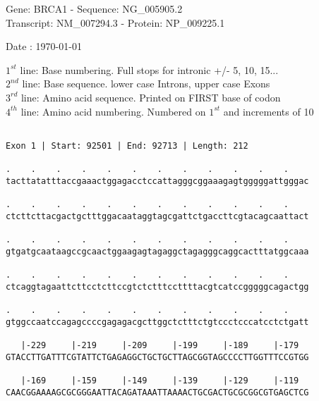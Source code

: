 \documentclass{article}
\begin{document}
\begin{center}
\begin{large}
Gene: BRCA1 - Sequence: NG\_005905.2\\
Transcript: NM\_007294.3 - Protein: NP\_009225.1
 
 Date : \today
\end{large}
\end{center}
$1^{st}$ line: Base numbering. Full stops for intronic +/- 5, 10, 15...\\
$2^{nd}$ line: Base sequence. lower case Introns, upper case Exons\\
$3^{rd}$ line: Amino acid sequence. Printed on FIRST base of codon\\
$4^{th}$ line: Amino acid numbering. Numbered on $1^{st}$ and increments of 10\\
 \begin{Verbatim}
 
Exon 1 | Start: 92501 | End: 92713 | Length: 212
 
.    .    .    .    .    .    .    .    .    .    .    .    
tacttatatttaccgaaactggagacctccattagggcggaaagagtgggggattgggac
                                                            
.    .    .    .    .    .    .    .    .    .    .    .    
ctcttcttacgactgctttggacaataggtagcgattctgaccttcgtacagcaattact
                                                            
.    .    .    .    .    .    .    .    .    .    .    .    
gtgatgcaataagccgcaactggaagagtagaggctagagggcaggcactttatggcaaa
                                                            
.    .    .    .    .    .    .    .    .    .    .    .    
ctcaggtagaattcttcctcttccgtctctttccttttacgtcatccgggggcagactgg
                                                            
.    .    .    .    .    .    .    .    .    .    .    .    
gtggccaatccagagccccgagagacgcttggctctttctgtccctcccatcctctgatt
                                                            
   |-229     |-219     |-209     |-199     |-189     |-179  
GTACCTTGATTTCGTATTCTGAGAGGCTGCTGCTTAGCGGTAGCCCCTTGGTTTCCGTGG
                                                            
   |-169     |-159     |-149     |-139     |-129     |-119  
CAACGGAAAAGCGCGGGAATTACAGATAAATTAAAACTGCGACTGCGCGGCGTGAGCTCG
                                                            

\end{Verbatim}
\end{document}
